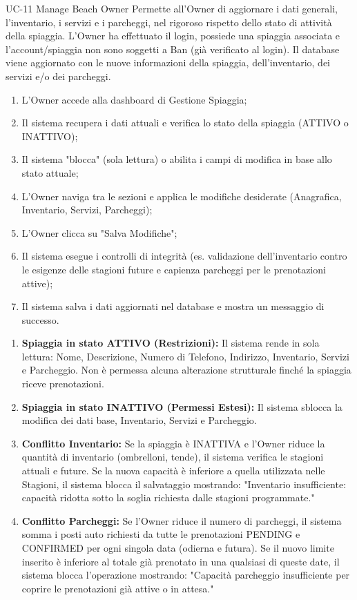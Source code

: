 \usecasetable
{UC-11}
{Manage Beach}
{Owner}
{Permette all'Owner di aggiornare i dati generali, l'inventario, i servizi e i parcheggi, nel rigoroso rispetto dello stato di attività della spiaggia.}
{L'Owner ha effettuato il login, possiede una spiaggia associata e l'account/spiaggia non sono soggetti a Ban (già verificato al login).}
{Il database viene aggiornato con le nuove informazioni della spiaggia, dell'inventario, dei servizi e/o dei parcheggi.}
{
	\begin{enumerate}[nosep, leftmargin=*]
		\item L'Owner accede alla dashboard di Gestione Spiaggia;
		\item Il sistema recupera i dati attuali e verifica lo stato della spiaggia (ATTIVO o INATTIVO);
		\item Il sistema "blocca" (sola lettura) o abilita i campi di modifica in base allo stato attuale;
		\item L'Owner naviga tra le sezioni e applica le modifiche desiderate (Anagrafica, Inventario, Servizi, Parcheggi);
		\item L'Owner clicca su "Salva Modifiche";
		\item Il sistema esegue i controlli di integrità (es. validazione dell'inventario contro le esigenze delle stagioni future e capienza parcheggi per le prenotazioni attive);
		\item Il sistema salva i dati aggiornati nel database e mostra un messaggio di successo.
	\end{enumerate}
}
{
	\begin{enumerate}[nosep, leftmargin=25px]
		\item[\textbf{3a.}] \textbf{Spiaggia in stato ATTIVO (Restrizioni):} Il sistema rende in sola lettura: Nome, Descrizione, Numero di Telefono, Indirizzo, Inventario, Servizi e Parcheggio. Non è permessa alcuna alterazione strutturale finché la spiaggia riceve prenotazioni.
		\item[\textbf{3b.}] \textbf{Spiaggia in stato INATTIVO (Permessi Estesi):} Il sistema sblocca la modifica dei dati base, Inventario, Servizi e Parcheggio.
		\item[\textbf{6a-e.}] \textbf{Conflitto Inventario:} Se la spiaggia è INATTIVA e l'Owner riduce la quantità di inventario (ombrelloni, tende), il sistema verifica le stagioni attuali e future. Se la nuova capacità è inferiore a quella utilizzata nelle Stagioni, il sistema blocca il salvataggio mostrando: "Inventario insufficiente: capacità ridotta sotto la soglia richiesta dalle stagioni programmate."
		\item[\textbf{6b-e.}] \textbf{Conflitto Parcheggi:} Se l'Owner riduce il numero di parcheggi, il sistema somma i posti auto richiesti da tutte le prenotazioni PENDING e CONFIRMED per ogni singola data (odierna e futura). Se il nuovo limite inserito è inferiore al totale già prenotato in una qualsiasi di queste date, il sistema blocca l'operazione mostrando: "Capacità parcheggio insufficiente per coprire le prenotazioni già attive o in attesa."
	\end{enumerate}
}
